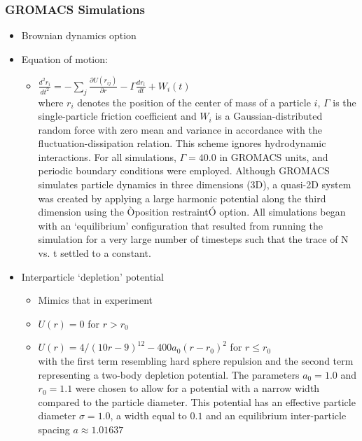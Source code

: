 \documentclass[11pt]{article}
\begin{document}
\subsubsection{GROMACS Simulations}
\label{sec-2-3-3}
\begin{itemize}

\item Brownian dynamics option\\
\label{sec-2-3-3-1}%
\item Equation of motion:
\label{sec-2-3-3-2}%
\begin{itemize}

\item $\frac{d^2 r_i}{dt^2}  = - \sum_j \frac{\partial{U(r_{ij})}}{{\partial r}}  - \Gamma  \frac{d r_i}{dt} + W_i (t)$\\
\label{sec-2-3-3-2-1}%
where $r_i$ denotes the position of the center of mass of a particle $i$, $\Gamma$ is the single-particle friction coefficient and $W_i$ is a Gaussian-distributed random force with zero mean and variance in accordance with the fluctuation-dissipation relation.  This scheme ignores hydrodynamic interactions. For all simulations, $\Gamma=40.0$ in GROMACS units, and periodic boundary conditions were employed. Although GROMACS simulates particle dynamics in three dimensions (3D), a quasi-2D system was created by applying a large harmonic potential along the third dimension using the Òposition restraintÓ option. All simulations began with an `equilibrium' configuration that resulted from running the simulation for a very large number of timesteps such that the trace of N vs. t settled to a constant.
\end{itemize} %

\item Interparticle `depletion' potential
\label{sec-2-3-3-3}%
\begin{itemize}

\item Mimics that in experiment\\
\label{sec-2-3-3-3-1}%
\item $U(r)=0$ for $r > r_0$\\
\label{sec-2-3-3-3-2}%
\item $U(r)=4/(10r-9)^{12} -  400 a_0 (r-r_0)^2$ for $r \le r_0$\\
\label{sec-2-3-3-3-3}%
with the first term resembling hard sphere repulsion and the second term  representing a two-body depletion potential. The parameters $a_0=1.0$ and $r_0=1.1$ were chosen to allow for  a potential with a narrow width compared to the particle diameter. This potential has an effective particle diameter $\sigma=1.0$,  a width equal to $0.1$ and an equilibrium inter-particle spacing $a \approx 1.01637$
\end{itemize} %


\end{itemize}
\end{document}

